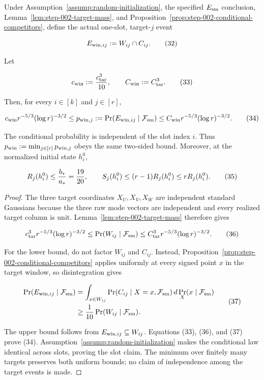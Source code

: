 \begin{proposition}\label{prop:step-002-joint-window}
Under Assumption~\ref{assump:random-initialization}, the specified $E_{\rm sm}$ conclusion, Lemma~\ref{lem:step-002-target-mass}, and
Proposition~\ref{prop:step-002-conditional-competitors}, define the actual
one-slot, target-$j$ event

\[
E_{{\rm win},ij}:=W_{ij}\cap C_{ij}.
\tag{32}
\]

Let

\[
c_{\rm win}:={c_{\rm tar}^3\over10},
\qquad C_{\rm win}:=C_{\rm tar}^3.
\tag{33}
\]

Then, for every $i\in[k]$ and $j\in[r]$,

\[
c_{\rm win}r^{-5/3}(\log r)^{-3/2}
\le p_{{\rm win},j}
:=\Pr(E_{{\rm win},ij}\mid\mathcal F_{\rm sm})
\le C_{\rm win}r^{-5/3}(\log r)^{-3/2}.
\tag{34}
\]

The conditional probability is independent of the slot index $i$. Thus
$p_{\rm win}:=\min_{j\in[r]}p_{{\rm win},j}$ obeys the same two-sided
bound. Moreover, at the normalized initial state $h_i^0$,

\[
R_j(h_i^0)\le {b_*\over a_*}={19\over20},
\qquad S_j(h_i^0)\le(r-1)R_j(h_i^0)\le rR_j(h_i^0).
\tag{35}
\]

\begin{proof}
The three target coordinates $X_U,X_V,X_W$ are independent standard
Gaussians because the three raw mode vectors are independent and every
realized target column is unit. Lemma~\ref{lem:step-002-target-mass}
therefore gives

\[
c_{\rm tar}^3r^{-5/3}(\log r)^{-3/2}
\le\Pr(W_{ij}\mid\mathcal F_{\rm sm})
\le C_{\rm tar}^3r^{-5/3}(\log r)^{-3/2}.
\tag{36}
\]

For the lower bound, do not factor $W_{ij}$ and $C_{ij}$. Instead,
Proposition~\ref{prop:step-002-conditional-competitors} applies uniformly
at every signed point $x$ in the target window, so disintegration gives

\[
\begin{aligned}
\Pr(E_{{\rm win},ij}\mid\mathcal F_{\rm sm})
&=\int_{x\in W_{ij}}
 \Pr(C_{ij}\mid X=x,\mathcal F_{\rm sm})\,
 d\Pr_X(x\mid\mathcal F_{\rm sm})\\
&\ge {1\over10}\Pr(W_{ij}\mid\mathcal F_{\rm sm}).
\end{aligned}
\tag{37}
\]

The upper bound follows from $E_{{\rm win},ij}\subseteq W_{ij}$. Equations
(33), (36), and (37) prove (34). Assumption~\ref{assump:random-initialization}
makes the conditional law identical across slots, proving the slot claim.
The minimum over finitely many targets preserves both uniform bounds; no
claim of independence among the target events is made.


\end{proof}
\end{proposition}
